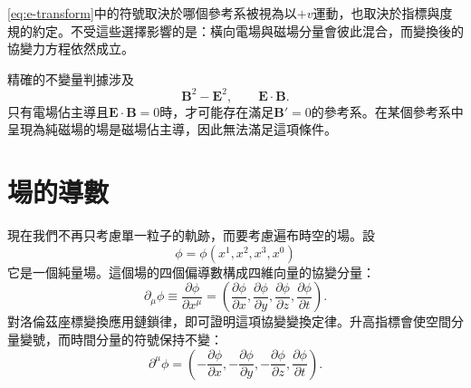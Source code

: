 \eqref{eq:e-transform}中的符號取決於哪個參考系被視為以\(+v\)運動，也取決於指標與度規的約定。不受這些選擇影響的是：橫向電場與磁場分量會彼此混合，而變換後的協變力方程依然成立。

\begin{classroomqa}
\end{classroomqa}

精確的不變量判據涉及
\begin{equation}
  \boldsymbol B^2-\boldsymbol E^2,
  \qquad
  \boldsymbol E\cdot\boldsymbol B.
\end{equation}
只有電場佔主導且\(\boldsymbol E\cdot\boldsymbol B=0\)時，才可能存在滿足\(\boldsymbol B'=0\)的參考系。在某個參考系中呈現為純磁場的場是磁場佔主導，因此無法滿足這項條件。

\begin{classroomqa}
\end{classroomqa}

\section{場的導數}

現在我們不再只考慮單一粒子的軌跡，而要考慮遍布時空的場。設
\begin{equation}
  \phi=\phi(x^1,x^2,x^3,x^0)
\end{equation}
它是一個純量場。這個場的四個偏導數構成四維向量的協變分量：
\begin{equation}
  \partial_\mu\phi
  \equiv\frac{\partial\phi}{\partial x^\mu}
  =\left(
    \frac{\partial\phi}{\partial x},
    \frac{\partial\phi}{\partial y},
    \frac{\partial\phi}{\partial z},
    \frac{\partial\phi}{\partial t}
  \right).
\end{equation}
對洛倫茲座標變換應用鏈鎖律，即可證明這項協變變換定律。升高指標會使空間分量變號，而時間分量的符號保持不變：
\begin{equation}
  \partial^\mu\phi
  =\left(
    -\frac{\partial\phi}{\partial x},
    -\frac{\partial\phi}{\partial y},
    -\frac{\partial\phi}{\partial z},
    \frac{\partial\phi}{\partial t}
  \right).
\end{equation}

